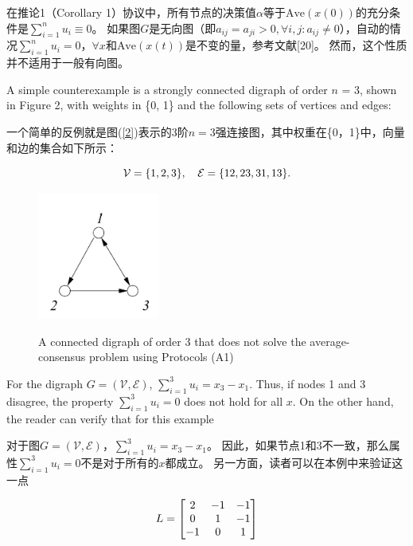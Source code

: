 \documentclass{article}
\begin{document}
\noindent 在推论1（Corollary 1）协议中，所有节点的决策值$\alpha$等于$\text{Ave}(x(0))$的充分条件是$\sum_{i=1}^{n}u_i \equiv 0$。
如果图$G$是无向图（即$a_{ij}=a_{ji} > 0,\forall i,j: a_{ij}\ne 0$），自动的情况$\sum_{i=1}^{n}u_i=0$，$\forall x$和$\text{Ave}(x(t))$是不变的量，参考文献[20]。
然而，这个性质并不适用于一般有向图。

{\color[gray]{0.5}
A simple counterexample is a strongly connected digraph of order $n$ = 3, shown in Figure 2, with weights in \{0, 1\} and the following sets of vertices and edges:
}

一个简单的反例就是图(\ref{2})表示的3阶$n=3$强连接图，其中权重在\{0，1\}中，向量和边的集合如下所示：

\begin{equation}
    \mathcal{V} = \{1, 2, 3 \},\quad \mathcal{E}=\{12, 23, 31, 13\}.
    \notag
\end{equation}

\begin{figure}[htbp]
    \centering
    \includegraphics[width=4cm]{figures/Fig2-ConnectedDigraph.jpeg}
    \label{ConnectedDigraph}
    \caption{A connected digraph of order 3 that does not solve the average-consensus problem using Protocols (A1)}
\end{figure}

{\color[gray]{0.5}
For the digraph $G=(\mathcal{V}, \mathcal{E})$, $\sum_{i=1}^{3}u_i = x_3 - x_1$. 
Thus, if nodes 1 and 3 disagree, the property $\sum_{i=1}^{3}u_i = 0$ does not hold for all $x$. 
On the other hand, the reader can verify that for this example
}

对于图$G=(\mathcal{V}, \mathcal{E})$，$\sum_{i=1}^{3}u_i = x_3 - x_1$。
因此，如果节点1和3不一致，那么属性$\sum_{i=1}^{3}u_i = 0$不是对于所有的$x$都成立。
另一方面，读者可以在本例中来验证这一点

\begin{equation}
    L = \left[
    \begin{matrix}
        2 & -1 & -1 \\
        0 & 1 & -1 \\
        -1 & 0 & 1 
    \end{matrix}
    \right]
    \notag
\end{equation}
\end{document}
